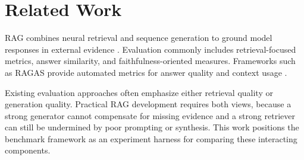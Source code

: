 \section{Related Work}

RAG combines neural retrieval and sequence generation to ground model responses in external evidence \cite{lewis2020retrieval}. Evaluation commonly includes retrieval-focused metrics, answer similarity, and faithfulness-oriented measures. Frameworks such as RAGAS provide automated metrics for answer quality and context usage \cite{es2023ragas}.

Existing evaluation approaches often emphasize either retrieval quality or generation quality. Practical RAG development requires both views, because a strong generator cannot compensate for missing evidence and a strong retriever can still be undermined by poor prompting or synthesis. This work positions the benchmark framework as an experiment harness for comparing these interacting components.

